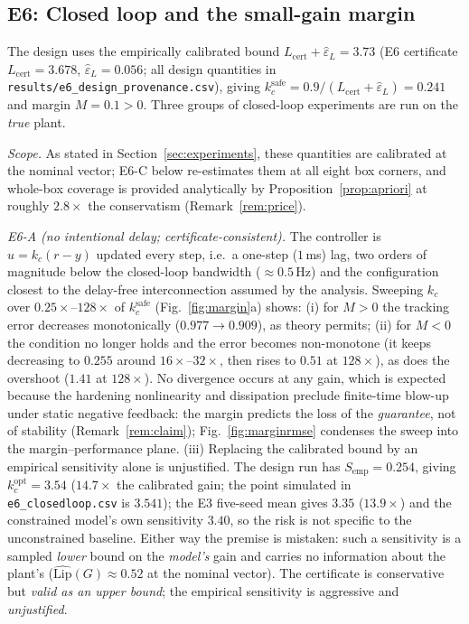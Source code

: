 \documentclass[11pt]{article}
\newcommand{\Lhat}{L_{\mathrm{cert}}}
\newcommand{\epsL}{\varepsilon_L}
\begin{document}
\subsection{E6: Closed loop and the small-gain margin}
The design uses the empirically calibrated bound $\Lhat+\hat\epsL=3.73$
(E6 certificate $\Lhat=3.678$, $\hat\epsL=0.056$; all design quantities in
\texttt{results/e6\_design\_provenance.csv}), giving
$k_c^{\mathrm{safe}}=0.9/(\Lhat+\hat\epsL)=0.241$ and margin $M=0.1>0$.
Three groups of closed-loop experiments are run on the \emph{true} plant.

\emph{Scope.} As stated in Section~\ref{sec:experiments}, these quantities are
calibrated at the nominal vector; E6-C below re-estimates them at all eight box
corners, and whole-box coverage is provided analytically by
Proposition~\ref{prop:apriori} at roughly $2.8\times$ the conservatism
(Remark~\ref{rem:price}).

\emph{E6-A (no intentional delay; certificate-consistent).} The controller
is $u=k_c(r-y)$ updated every step, i.e.\ a one-step ($1$\,ms) lag, two orders
of magnitude below the closed-loop bandwidth ($\approx0.5$\,Hz) and the
configuration closest to the delay-free interconnection assumed by the
analysis. Sweeping $k_c$ over $0.25\times$--$128\times$ of
$k_c^{\mathrm{safe}}$ (Fig.~\ref{fig:margin}a) shows: (i) for $M>0$ the
tracking error decreases monotonically ($0.977\to0.909$), as theory permits; (ii) for $M<0$ the condition no
longer holds and the error becomes non-monotone (it keeps decreasing to
$0.255$ around $16\times$--$32\times$, then rises to $0.51$ at $128\times$),
as does the overshoot ($1.41$ at $128\times$). No divergence occurs at any
gain, which is expected because the hardening nonlinearity and dissipation
preclude finite-time blow-up under static negative feedback: the margin
predicts the loss of the \emph{guarantee}, not of stability
(Remark~\ref{rem:claim}); Fig.~\ref{fig:marginrmse} condenses the sweep into
the margin--performance plane. (iii) Replacing the calibrated bound by an
empirical sensitivity alone is unjustified. The design run has
$S_{\mathrm{emp}}=0.254$, giving $k_c^{\mathrm{opt}}=3.54$ ($14.7\times$ the
calibrated gain; the point simulated in \texttt{e6\_closedloop.csv} is
$3.541$); the E3 five-seed mean gives $3.35$ ($13.9\times$) and the
constrained model's own sensitivity $3.40$, so the risk is not specific to
the unconstrained baseline.
Either way the premise is mistaken: such a sensitivity is a sampled
\emph{lower} bound on the \emph{model's} gain and carries no information
about the plant's ($\widehat{\mathrm{Lip}}(G)\approx0.52$ at the nominal
vector). The certificate is conservative but \emph{valid as an upper bound};
the empirical sensitivity is aggressive and \emph{unjustified}.
\end{document}
